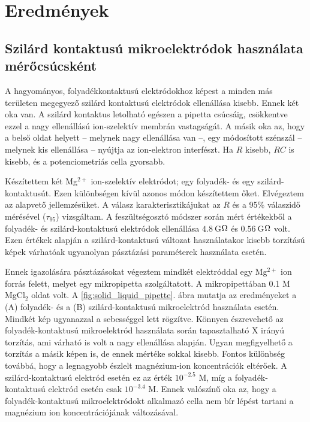 \section{Eredmények}
\subsection{Szilárd kontaktusú mikroelektródok használata mérőcsúcsként}
A hagyományos, folyadékkontaktusú elektródokhoz képest a minden más területen megegyező szilárd kontaktusú elektródok ellenállása kisebb.
Ennek két oka van.
A szilárd kontaktus letolható egészen a pipetta csúcsáig, csökkentve ezzel a nagy ellenállású ion-szelektív membrán vastagságát.
A másik oka az, hogy a belső oldat helyett -- melynek nagy ellenállása van --, egy módosított szénszál -- melynek kis ellenállása -- nyújtja az ion-elektron interfészt.
Ha $R$ kisebb, $RC$ is kisebb, és a potenciometriás cella gyorsabb.

Készítettem két Mg$^{2+}$ ion-szelektív elektródot; egy folyadék- és egy szilárd-kon\-tak\-tu\-sút.
Ezen különbségen kívül azonos módon készítettem őket.
Elvégeztem az alapvető jellemzésüket.
A válasz karakterisztikájukat az $R$ és a 95\% válaszidő mérésével ($\tau_{95}$) vizsgáltam.
A feszültségosztó módszer során mért értékekből a folyadék- és szilárd-kontaktusú elektródok ellenállása $4.8~$G$\ohm$ és $0.56~$G$\ohm$ volt.
Ezen értékek alapján a szilárd-kontaktusú változat használatakor kisebb torzítású képek várhatóak ugyanolyan pásztázási paraméterek használata esetén.

Ennek igazolására pásztázásokat végeztem mindkét elektróddal egy Mg$^{2+}$ ion forrás felett, melyet egy mikropipetta szolgáltatott.
A mikropipettában 0.1 M MgCl$_2$ oldat volt.
A \ref{fig:solid_liquid_pipette}. ábra mutatja az eredményeket a (A) folyadék- és a (B) szilárd-kontaktusú mikroelektród használata esetén.
Mindkét kép ugyanazzal a sebességgel lett rögzítve.
Könnyen észrevehető az folyadék-kontaktusú mikroelektród használata során tapasztalható X irányú torzítás, ami várható is volt a nagy ellenállása alapján.
Ugyan megfigyelhető a torzítás a másik képen is, de ennek mértéke sokkal kisebb.
Fontos különbség továbbá, hogy a legnagyobb észlelt magnézium-ion koncentrációk eltérőek.
A szilárd-kontaktusú elektród esetén ez az érték $10^{-2.5}$ M, míg a folyadék-kontaktusú elektród esetén csak $10^{-3.4}$ M.
Ennek valószínű oka az, hogy a folyadék-kontaktusú mikroelektródokt alkalmazó cella nem bír lépést tartani a magnézium ion koncentrációjának változásával.

